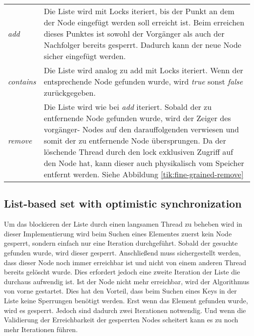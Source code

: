 \begin{table}[H]
    \begin{tabularx}{\textwidth}{lX}
		\textit{add} & Die Liste wird mit Locks iteriert, bis der Punkt an dem der Node eingefügt werden soll erreicht ist. Beim erreichen dieses Punktes ist sowohl der Vorgänger als auch der Nachfolger bereits gesperrt. Dadurch kann der neue Node sicher eingefügt werden.\\
		\textit{contains} & Die Liste wird analog zu add mit Locks iteriert. 
		Wenn der entsprechende Node gefunden wurde, wird \textit{true} sonst \textit{false} zurückgegeben. \\
		\textit{remove} & Die Liste wird wie bei \textit{add} iteriert. Sobald der zu entfernende Node gefunden wurde, wird der Zeiger des vorgänger- Nodes
		auf den darauffolgenden verwiesen und somit der zu entfernende Node übersprungen. Da der löschende Thread durch den lock exklusiven Zugriff auf den Node hat, kann dieser auch physikalisch vom Speicher entfernt werden. 
		Siehe Abbildung \ref{tik:fine-grained-remove}\\
    \end{tabularx}
\end{table}


\subsection{List-based set with optimistic synchronization}

Um das blockieren der Liste durch einen langsamen Thread zu beheben wird in dieser Implementierung wird beim Suchen eines Elementes zuerst kein Node gesperrt, sondern einfach nur eine Iteration durchgeführt. 
Sobald der gesuchte gefunden wurde, wird dieser gesperrt. Anschließend muss sichergestellt werden, dass dieser Node noch immer erreichbar ist 
und nicht von einem anderen Thread bereits gelöscht wurde. Dies erfordert jedoch eine zweite Iteration der Liste die durchaus aufwendig ist. Ist der Node nicht mehr erreichbar, wird der Algorithmus von vorne gestartet. Dies hat den Vorteil, dass beim Suchen eines Keys in der Liste keine Sperrungen benötigt werden. 
Erst wenn das Element gefunden wurde, wird es gesperrt. Jedoch sind dadurch zwei Iterationen notwendig. Und wenn die Validierung der Erreichbarkeit der gesperrten Nodes scheitert kann es zu noch mehr Iterationen führen.

